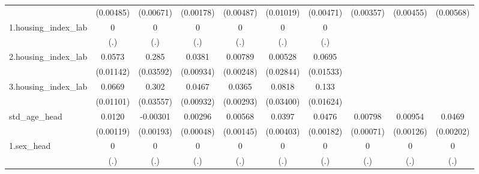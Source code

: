 \begin{table}[htbp]
{\begin{tabular}{l*{9}{c}}
            &   (0.00485)         &   (0.00671)         &   (0.00178)         &   (0.00487)         &   (0.01019)         &   (0.00471)         &   (0.00357)         &   (0.00455)         &   (0.00568)         \\
1.housing_index_lab&           0         &           0         &           0         &           0         &           0         &           0         &                     &                     &                     \\
            &         (.)         &         (.)         &         (.)         &         (.)         &         (.)         &         (.)         &                     &                     &                     \\
2.housing_index_lab&      0.0573\sym{***}&       0.285\sym{***}&      0.0381\sym{***}&     0.00789\sym{***}&     0.00528         &      0.0695\sym{***}&                     &                     &                     \\
            &   (0.01142)         &   (0.03592)         &   (0.00934)         &   (0.00248)         &   (0.02844)         &   (0.01533)         &                     &                     &                     \\
3.housing_index_lab&      0.0669\sym{***}&       0.302\sym{***}&      0.0467\sym{***}&      0.0365\sym{***}&      0.0818\sym{**} &       0.133\sym{***}&                     &                     &                     \\
            &   (0.01101)         &   (0.03557)         &   (0.00932)         &   (0.00293)         &   (0.03400)         &   (0.01624)         &                     &                     &                     \\
std_age_head&      0.0120\sym{***}&    -0.00301         &     0.00296\sym{***}&     0.00568\sym{***}&      0.0397\sym{***}&      0.0476\sym{***}&     0.00798\sym{***}&     0.00954\sym{***}&      0.0469\sym{***}\\
            &   (0.00119)         &   (0.00193)         &   (0.00048)         &   (0.00145)         &   (0.00403)         &   (0.00182)         &   (0.00071)         &   (0.00126)         &   (0.00202)         \\
1.sex_head  &           0         &           0         &           0         &           0         &           0         &           0         &           0         &           0         &           0         \\
            &         (.)         &         (.)         &         (.)         &         (.)         &         (.)         &         (.)         &         (.)         &         (.)         &         (.)         \\

\end{tabular}}
\end{table}
